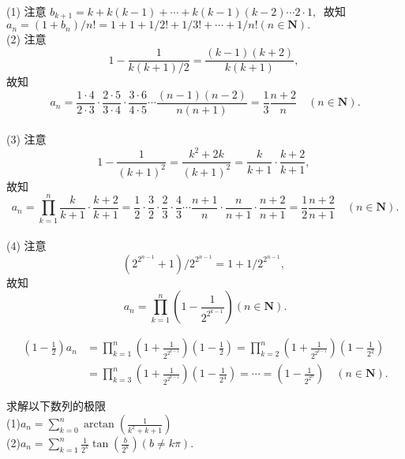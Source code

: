 	\begin{solution}
		(1) 注意 $ b_{k+1}=k+k(k-1)+\cdots+k(k-1)(k-2) \cdots 2 \cdot 1 ,\ $ 故知  $a_{n}=\left(1+b_{n}\right) / n  !  =1+   1+1 / 2 !+1 / 3 !+\cdots+1 / n !(n \in \mathbf{N}) .$\\
		(2) 注意$$  1-\frac{1}{k(k+1) / 2}=\frac{(k-1)(k+2)}{k(k+1)} ,\ $$故知 $$ a_{n}=\frac{1 \cdot 4}{2 \cdot 3} \cdot \frac{2 \cdot 5}{3 \cdot 4} \cdot \frac{3 \cdot 6}{4 \cdot 5} \cdots \frac{(n-1)(n-2)}{n(n+1)}=\frac{1}{3} \frac{n+2}{n} \quad(n \in \mathbf{N}) . $$\\
		(3) 注意  $$1-\frac{1}{(k+1)^{2}}=\frac{k^{2}+2 k}{(k+1)^{2}}=\frac{k}{k+1} \cdot \frac{k+2}{k+1} ,\ $$ 故知 $$ a_{n}=\prod_{k=1}^{n} \frac{k}{k+1} \cdot \frac{k+2}{k+1}=\frac{1}{2} \cdot \frac{3}{2} \cdot \frac{2}{3} \cdot \frac{4}{3} \cdots \frac{n+1}{n} \cdot \frac{n}{n+1} \cdot \frac{n+2}{n+1}=\frac{1}{2} \frac{n+2}{n+1} \quad(n \in \mathbf{N}) .$$\\
		(4) 注意$$  \left(2^{2^{n-1}}+1\right) / 2^{2^{n-1}}=1+1 / 2^{2^{n-1}} ,\ $$ 故知  $$a_{n}=\prod_{k=1}^{n}\left(1-\frac{1}{2^{2^{k-1}}}\right)(n \in \mathbf{N}) .$$
		
		$$
		\begin{aligned}
			\left(1-\frac{1}{2}\right) a_{n}&=\prod_{k=1}^{n}\left(1+\frac{1}{2^{2^{k-1}}}\right)\left(1-\frac{1}{2}\right)=\prod_{k=2}^{n}\left(1+\frac{1}{2^{2^{k-1}}}\right)\left(1-\frac{1}{2^{2}}\right)\\
			&=\prod_{k=3}^{n}\left(1+\frac{1}{2^{2^{k-1}}}\right)\left(1-\frac{1}{2^{4}}\right)=\cdots=\left(1-\frac{1}{2^{2^{n}}}\right) \quad(n \in \mathbf{N}) .
		\end{aligned}$$ 
	\end{solution}
	\newpage
	\begin{problem}
		求解以下数列的极限\\
		(1)$a_n=\sum\limits_{k=0}^{n}\arctan\left(\frac{1}{k^2+k+1}\right)$\\
		(2)$a_n=\sum\limits_{k=1}^{n}\frac{1}{2^k}\tan\left(\frac{b}{2^k}\right)\left(b\neq k\pi\right).$
	\end{problem}
	
